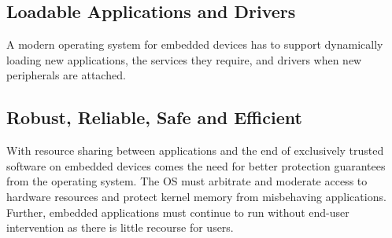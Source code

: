 \subsection{Loadable Applications and Drivers}

A modern operating system for embedded devices has
to support dynamically loading new applications, the services they require,
and drivers when new peripherals are attached.




\subsection{Robust, Reliable, Safe and Efficient}

With resource sharing between applications and the end of exclusively trusted
software on embedded devices comes the need for better protection guarantees
from the operating system. The OS must arbitrate and moderate access to
hardware resources and protect kernel memory from misbehaving applications.
Further, embedded applications must continue to run without end-user
intervention as there is little recourse for users.



